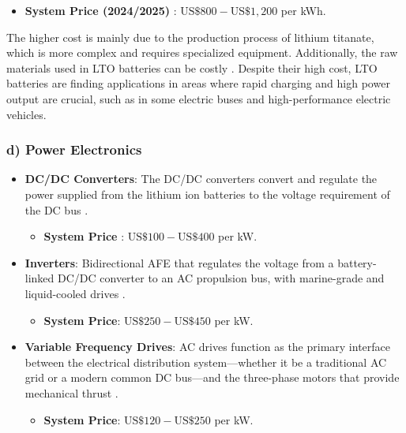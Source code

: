 \begin{itemize}
	\item \textbf{System Price (2024/2025)} \cite{ritarpower}: $\text{US}\$800-\text{US}\$1,200$ per kWh.
\end{itemize}

The higher cost is mainly due to the production process of lithium titanate, which is more complex and requires specialized equipment. Additionally, the raw materials used in LTO batteries can be costly \cite{ritarpower}. Despite their high cost, LTO batteries are finding applications in areas where rapid charging and high power output are crucial, such as in some electric buses and high-performance electric vehicles.\\

\subsubsection{d) Power Electronics}

\begin{itemize}
	\item \textbf{DC/DC Converters}: The DC/DC converters convert and regulate the power supplied from the lithium ion batteries to the voltage requirement of the DC bus \cite{ProfMar}. 
	\begin{itemize}
		\item  \textbf{System Price} \cite{Akbarzadeh} \cite{TestEq}: $\text{US}\$100-\text{US}\$400$ per kW.
	\end{itemize}	
	
	\item \textbf{Inverters}: Bidirectional AFE that regulates the voltage from a battery-linked DC/DC converter to an AC propulsion bus, with marine-grade and liquid-cooled drives \cite{Wartsila3}. 
	\begin{itemize}
		\item \textbf{System Price}: $\text{US}\$250-\text{US}\$450$ per kW.
	\end{itemize}	
	\item \textbf{Variable Frequency Drives}: AC drives function as the primary interface between the electrical distribution system—whether it be a traditional AC grid or a modern common DC bus—and the three-phase motors that provide mechanical thrust \cite{Radica}. 
	\begin{itemize}
		\item \textbf{System Price}: $\text{US}\$120-\text{US}\$250$ per kW.
	\end{itemize}	
\end{itemize}

